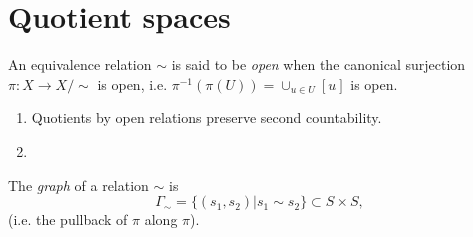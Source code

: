 \section{Quotient spaces}

\begin{defn}
An equivalence relation $\sim$ is said to be \emph{open} when the
canonical surjection $\pi: X \to X / \sim$ is open, i.e.
$\pi^{-1}(\pi(U)) = \cup_{u \in U} [u]$ is open.
\end{defn}

\begin{prop}
  \begin{enumerate}
    \item{
      Quotients by open relations preserve second countability.
    }
    \item{
    }
  \end{enumerate}
\end{prop}

\begin{defn}
The \emph{graph} of a relation $\sim$ is
$$
  \Gamma_\sim
= \{ (s_1, s_2) \vert s_1 \sim s_2 \}
\subset S \times S,
$$
(i.e. the pullback of $\pi$ along $\pi$).
\end{defn}
